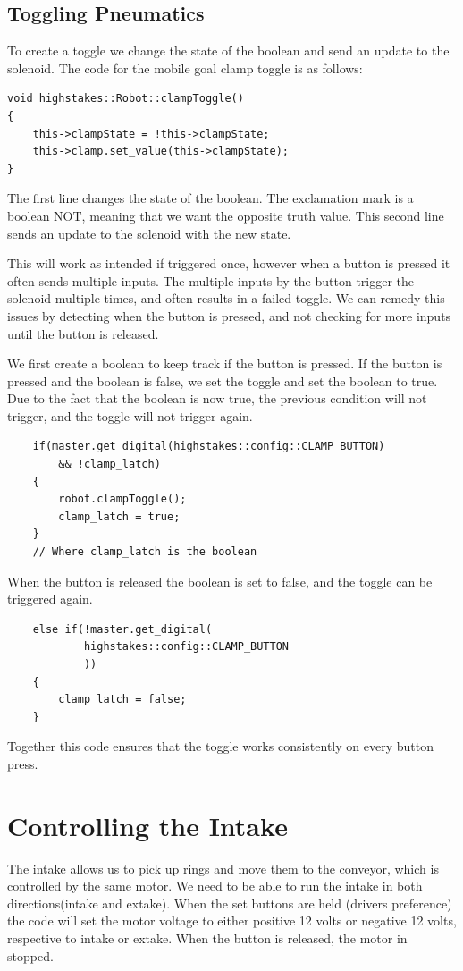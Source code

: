 \documentclass[12pt]{report}
\begin{document}
\subsection{Toggling Pneumatics}\label{SUBSEC::toggle}
To create a toggle we change the state of the boolean and send an update to the solenoid.
The code for the mobile goal clamp toggle is as follows:
\begin{verbatim}
void highstakes::Robot::clampToggle()
{
    this->clampState = !this->clampState;
    this->clamp.set_value(this->clampState);
}
\end{verbatim}

The first line changes the state of the boolean. 
The exclamation mark is a boolean NOT, meaning that we want the opposite truth value.
This second line sends an update to the solenoid with the new state.

This will work as intended if triggered once,
    however when a button is pressed it often sends multiple inputs.
The multiple inputs by the button trigger the solenoid multiple times,
    and often results in a failed toggle.
We can remedy this issues by detecting when the button is pressed,
    and not checking for more inputs until the button is released.

We first create a boolean to keep track if the button is pressed.
If the button is pressed and the boolean is false,
    we set the toggle and set the boolean to true.
Due to the fact that the boolean is now true, 
    the previous condition will not trigger, 
    and the toggle will not trigger again.

\begin{verbatim}
    if(master.get_digital(highstakes::config::CLAMP_BUTTON) 
        && !clamp_latch)
    {
        robot.clampToggle();
        clamp_latch = true;
    }
    // Where clamp_latch is the boolean
\end{verbatim}

When the button is released the boolean is set to false, and the toggle can be triggered again.
\begin{verbatim}
    else if(!master.get_digital(
            highstakes::config::CLAMP_BUTTON
            ))
    {
        clamp_latch = false;
    } 
\end{verbatim}

Together this code ensures that the toggle works consistently on every button press.

\section{Controlling the Intake}
The intake allows us to pick up rings and move them to the conveyor,
    which is controlled by the same motor.
We need to be able to run the intake in both directions(intake and extake).
When the set buttons are held (drivers preference) the code will set the motor voltage
    to either positive 12 volts or negative 12 volts, respective to intake or extake.
When the button is released, the motor in stopped.
\end{document}

